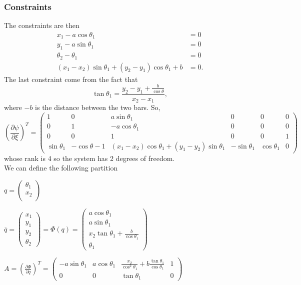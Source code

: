 \subsubsection{Constraints}
The constraints are then
\begin{align}
x_1 - a \cos \theta_1 &= 0\\
y_1 - a \sin \theta_1 &= 0\\
\theta_2 -  \theta_1 &= 0\\
(x_1 - x_2) \sin \theta_1 + (y_2 - y_1) \cos \theta_1 + b &= 0.
\end{align}
The last constraint come from the fact that
$$\tan \theta_1 = \frac{y_2-y_1+\frac{b}{\cos\theta}}{x_2-x_1},$$
where $-b$ is the distance between the two bars. So,
$$(\frac{\partial \psi}{\partial \xi})^T = \left( \begin{array}{cccccc}
1 &  0 & a\sin\theta_1  & 0 & 0 & 0\\
0 & 1 & -a\cos\theta_1 & 0 & 0 & 0\\
0 & 0 & 1 & 0 & 0 & 1\\
\sin\theta_1 & -\cos\theta-1 & (x_1-x_2)\cos\theta_1+(y_1-y_2)\sin\theta_1 & -\sin\theta_1 & \cos\theta_1 & 0
\end{array} \right)$$
whose rank is 4 so the system has 2 degrees of freedom. \\

We can define the following partition

$q = \left( \begin{array}{c}
\theta_1\\
x_2\\
\end{array} \right)$

$\overline{q} = \left( \begin{array}{c}
x_1\\
y_1\\
y_2\\
\theta_2
\end{array} \right) = \Phi(q) = \left( \begin{array}{c}
a\cos\theta_1\\
a\sin\theta_1\\
x_2\tan\theta_1 + \frac{b}{\cos\theta_1}\\
\theta_1
\end{array} \right)$

$ A = (\frac{\partial \Phi}{\partial q})^T = \left( \begin{array}{cccc}
-a\sin\theta_1 & a\cos\theta_1 & \frac{x_2}{\cos^2\theta_1} + b\frac{\tan \theta_1}{\cos \theta_1}  & 1\\
0 & 0 & \tan\theta_1 & 0
\end{array} \right)$

